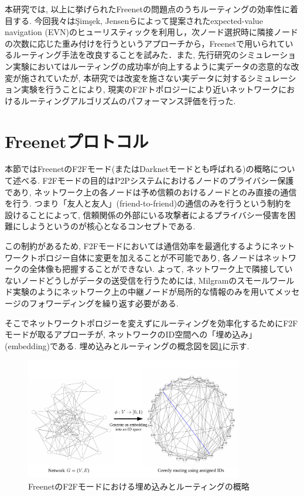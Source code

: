 \documentclass[technicalreport]{./ieicej-v3.0/UTF/ieicej}
\begin{document}
本研究では, 以上に挙げられたFreenetの問題点のうちルーティングの効率性に着目する. 今回我々は{\c{S}}im{\c{s}}ek, Jensenらによって提案されたexpected-value navigation (EVN)\cite{simsek2008navigating}のヒューリスティックを利用し，次ノード選択時に隣接ノードの次数に応じた重み付けを行うというアプローチから，Freenetで用いられているルーティング手法を改良することを試みた．また, 先行研究のシミュレーション実験においてはルーティングの成功率が向上するように実データの恣意的な改変が施されていたが, 本研究では改変を施さない実データに対するシミュレーション実験を行うことにより, 現実のF2Fトポロジーにより近いネットワークにおけるルーティングアルゴリズムのパフォーマンス評価を行った.


 \section{Freenetプロトコル} \label{sec:freenetprotocols}
  本節ではFreenetのF2Fモード(またはDarknetモードとも呼ばれる)の概略について述べる. F2Fモードの目的はP2Pシステムにおけるノードのプライバシー保護であり, ネットワーク上の各ノードは予め信頼のおけるノードとのみ直接の通信を行う. つまり「友人と友人」(friend-to-friend)の通信のみを行うという制約を設けることによって, 信頼関係の外部にいる攻撃者によるプライバシー侵害を困難にしようというのが核心となるコンセプトである.

   この制約があるため, F2Fモードにおいては通信効率を最適化するようにネットワークトポロジー自体に変更を加えることが不可能であり, 各ノードはネットワークの全体像も把握することができない. よって, ネットワーク上で隣接していないノードどうしがデータの送受信を行うためには, Milgramのスモールワールド実験\cite{milgram67smallworld}のようにネットワーク上の中継ノードが局所的な情報のみを用いてメッセージのフォワーディングを繰り返す必要がある. 

   そこでネットワークトポロジーを変えずにルーティングを効率化するためにF2Fモードが取るアプローチが, ネットワークのID空間への「埋め込み」(embedding)である. 埋め込みとルーティングの概念図を図\ref{fig:f2f_overview}に示す.

   \begin{figure}[htb]
    \centerline{\includegraphics[width=95mm]{../fig/greedy_embedding_overview.pdf}}
    \caption{FreenetのF2Fモードにおける埋め込みとルーティングの概略}
    \label{fig:f2f_overview}
   \end{figure}
\end{document}
